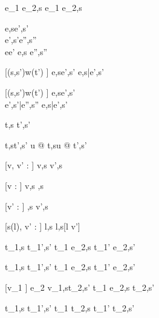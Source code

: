   { }
  {e_1 \Xor e_2,s \normalise e_1 \Xor e_2,s}

    {e,s\evaluate e',s' \\
     e',s'\normalise e'',s''\\
    e\neq e'}
    {e,s \normalise e'',s''}


[\Delta(s,s')\cap w(t') \equiv \emptyset]
    {e,s\normalise e',s'}
    {e,s\bar{\normalise}e',s'}

[\Delta(s,s')\cap w(t') \neq \emptyset]
    {e,s\normalise e',s'\\
    e',s'\bar{\normalise}e'',s''}
    {e,s\bar{\normalise}e',s'}







  {t,s  t',s'}

  {t,st',s'}
  {u @ t,su @ t',s'}

[v, v' : \tau]
  { }
  {\Edit v,s  \Edit v',s}

[v : \tau]
  { }
  {\Edit v,s \handle{\Empty} \Enter \tau,s}

[v' : \tau]
  { }
  {\Enter \tau,s  \Edit v',s}

[s(l), v' : \tau]
  { }
  {\Update l,s  \Update l,s[l \mapsto v']{}}


  {t_1,s  t_1',s'}
  {t_1 \Then e_2,s  t_1' \Then e_2,s'}

  {t_1,s  t_1',s'}
  {t_1 \Next e_2,s  t_1' \Next e_2,s'}

[\equiv v_1 \wedge \neg{}]
  {e_2 v_1,s\normalise t_2,s'}
  {t_1 \Next e_2,s \handle{\Continue} t_2,s'}


  {t_1,s  t_1',s' }
  {t_1 \And t_2,s  t_1' \And t_2,s'}

